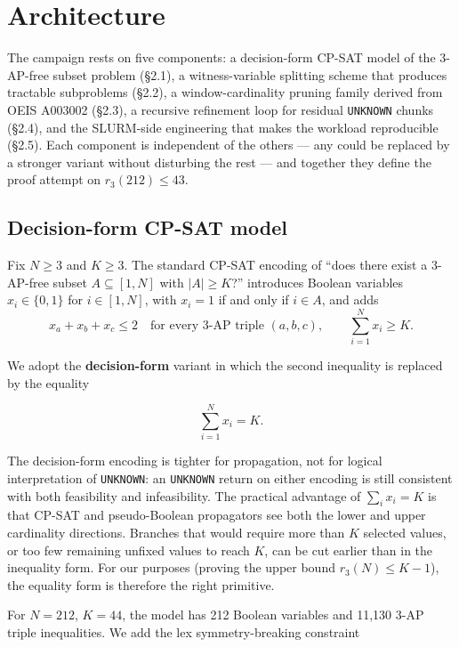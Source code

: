 \section{Architecture}\label{architecture}

The campaign rests on five components: a decision-form CP-SAT model
of the 3-AP-free subset problem (§2.1), a witness-variable splitting
scheme that produces tractable subproblems (§2.2), a window-cardinality
pruning family derived from OEIS A003002 (§2.3), a recursive refinement
loop for residual \texttt{UNKNOWN} chunks (§2.4), and the SLURM-side
engineering that makes the workload reproducible (§2.5). Each
component is independent of the others --- any could be replaced by a
stronger variant without disturbing the rest --- and together they
define the proof attempt on $r_3(212) \leq 43$.

\subsection{Decision-form CP-SAT model}\label{decision-form-cp-sat-model}

Fix $N \geq 3$ and $K \geq 3$. The standard CP-SAT encoding of ``does
there exist a 3-AP-free subset $A \subseteq [1,N]$ with $|A| \geq K$?''
introduces Boolean variables $x_i \in \{0,1\}$ for $i \in [1,N]$, with
$x_i=1$ if and only if $i \in A$, and adds
\[
  x_a+x_b+x_c \leq 2
  \quad\text{for every 3-AP triple }(a,b,c),
  \qquad
  \sum_{i=1}^{N}x_i \geq K.
\]

We adopt the \textbf{decision-form} variant in which the second inequality
is replaced by the equality

\[
  \sum_{i=1}^{N}x_i = K.
\]

The decision-form encoding is tighter for propagation, not for logical
interpretation of \texttt{UNKNOWN}: an \texttt{UNKNOWN} return on either encoding is still
consistent with both feasibility and infeasibility. The practical advantage of
$\sum_i x_i = K$ is that CP-SAT and pseudo-Boolean propagators see both the
lower and upper cardinality directions. Branches that would require more than
$K$ selected values, or too few remaining unfixed values to reach $K$, can be
cut earlier than in the inequality form. For our purposes (proving the upper
bound $r_3(N) \leq K-1$), the equality form is therefore the right primitive.

For $N = 212$, $K = 44$, the model has 212 Boolean variables and
11,130 3-AP triple inequalities. We add the lex symmetry-breaking
constraint

